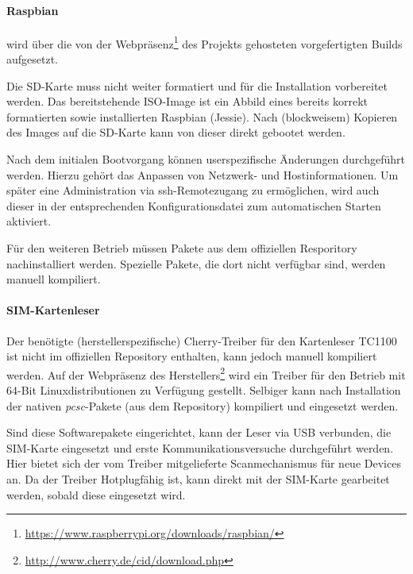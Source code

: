 			\paragraph{Raspbian} wird über die von der Webpräsenz\footnote{\url{https://www.raspberrypi.org/downloads/raspbian/}}
            des Projekts gehosteten vorgefertigten Builds aufgesetzt.

            Die SD-Karte muss nicht weiter formatiert und für die Installation vorbereitet werden. Das
            bereitstehende ISO-Image ist ein Abbild eines bereits korrekt formatierten sowie installierten
            Raspbian (Jessie). Nach (blockweisem) Kopieren des Images auf die SD-Karte kann von dieser direkt
            gebootet werden.

            Nach dem initialen Bootvorgang können userspezifische Änderungen durchgeführt werden. Hierzu
            gehört das Anpassen von Netzwerk- und Hostinformationen. Um später eine Administration via
            \ac{ssh}-Remotezugang zu ermöglichen, wird auch dieser in der entsprechenden Konfigurationsdatei
            zum automatischen Starten aktiviert.

            Für den weiteren Betrieb müssen Pakete aus dem offiziellen Resporitory
            nachinstalliert werden. Spezielle Pakete, die dort nicht verfügbar sind, werden
            manuell kompiliert.

            \paragraph{SIM-Kartenleser} Der benötigte (herstellerspezifische)
            Cherry-Treiber für den Kartenleser TC1100 ist nicht im offiziellen Repository enthalten, kann jedoch
            manuell kompiliert werden. Auf der Webpräsenz des Herstellers\footnote{\url{http://www.cherry.de/cid/download.php}}
            wird ein Treiber für den Betrieb mit 64-Bit Linuxdistributionen zu Verfügung gestellt.
            Selbiger kann nach Installation der nativen \textit{pcsc}-Pakete (aus dem Repository)
            kompiliert und eingesetzt werden.

            Sind diese Softwarepakete eingerichtet, kann der Leser via USB verbunden, die SIM-Karte eingesetzt
            und erste Kommunikationsversuche durchgeführt werden. Hier bietet sich der vom
            Treiber mitgelieferte Scanmechanismus für neue Devices an. Da der Treiber
            Hotplugfähig ist, kann direkt mit der SIM-Karte gearbeitet werden, sobald diese
            eingesetzt wird.

